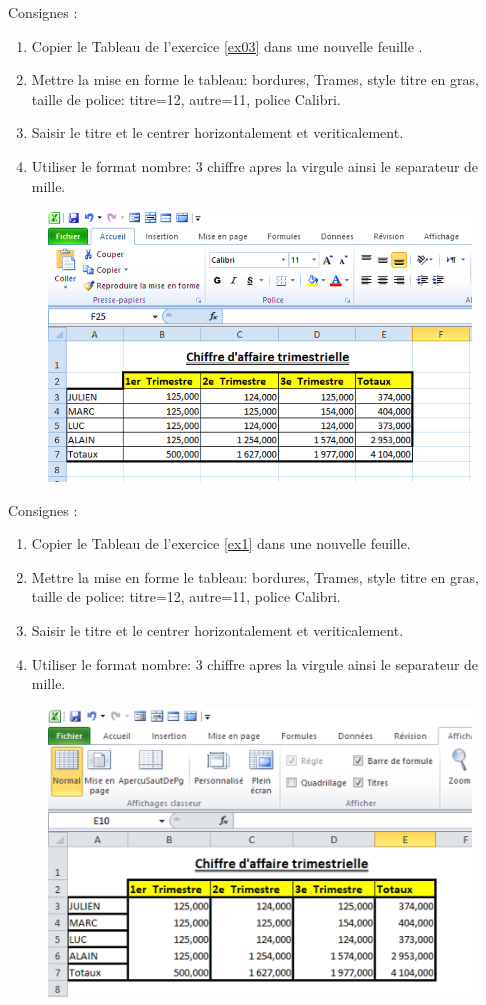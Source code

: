 \begin{exercice}\label{ex1}
	Consignes :
 	\begin{enumerate}
 				
 	\item  Copier le Tableau de l'exercice \ref{ex03} dans une nouvelle feuille .  				
 	\item  Mettre la mise en forme le tableau: bordures, Trames, style titre en gras, taille de police: titre=12, autre=11, police Calibri.				
 	\item  Saisir le titre et le centrer horizontalement et veriticalement.				
 	\item  Utiliser le format nombre: 3 chiffre apres la virgule ainsi le separateur de mille.				
 		
 	\end{enumerate}
\end{exercice}  
\begin{figure} [H]  
	\centering
	\includegraphics[scale=0.2,width=0.7 \linewidth]{img/ex01} 
\end{figure}
\begin{exercice}\label{ex2}
	Consignes :
	\begin{enumerate}
		
		\item  Copier le Tableau de l'exercice \ref{ex1} dans une nouvelle feuille.  				
		\item  Mettre la mise en forme le tableau: bordures, Trames, style titre en gras, taille de police: titre=12, autre=11, police Calibri.				
		\item  Saisir le titre et le centrer horizontalement et veriticalement.				
		\item  Utiliser le format nombre: 3 chiffre apres la virgule ainsi le separateur de mille.
	\end{enumerate}	
\end{exercice}
\begin{figure}[H]
	\centering
	\includegraphics[scale=0.2,width=0.7 \linewidth]{img/ex02} 
\end{figure}

 
